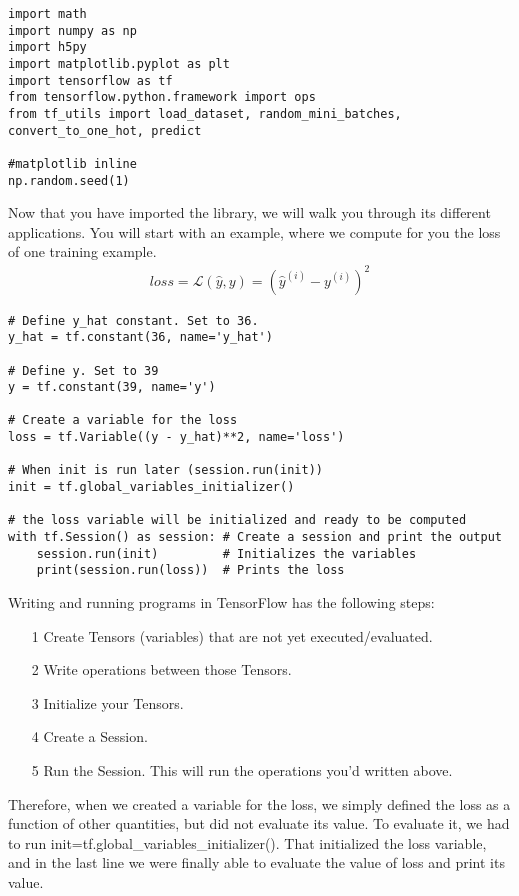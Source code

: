 \begin{verbatim}
import math
import numpy as np
import h5py
import matplotlib.pyplot as plt
import tensorflow as tf
from tensorflow.python.framework import ops
from tf_utils import load_dataset, random_mini_batches, convert_to_one_hot, predict

#matplotlib inline
np.random.seed(1)
\end{verbatim}

Now that you have imported the library, we will walk you through its different applications. You will start with an example, where we compute for you the loss of one training example. 
\begin{align}
loss = \mathcal{L}(\hat{y}, y) = (\hat y^{(i)} - y^{(i)})^2
\end{align}


\begin{verbatim}
# Define y_hat constant. Set to 36.
y_hat = tf.constant(36, name='y_hat')  

# Define y. Set to 39          
y = tf.constant(39, name='y') 
                   
# Create a variable for the loss
loss = tf.Variable((y - y_hat)**2, name='loss')  

# When init is run later (session.run(init))
init = tf.global_variables_initializer()         

# the loss variable will be initialized and ready to be computed
with tf.Session() as session: # Create a session and print the output
    session.run(init)         # Initializes the variables
    print(session.run(loss))  # Prints the loss
\end{verbatim}

Writing and running programs in TensorFlow has the following steps:
\begin{itemize}
\item[1] Create Tensors (variables) that are not yet executed/evaluated.
\item[2] Write operations between those Tensors.
\item[3] Initialize your Tensors.
\item[4] Create a Session.
\item[5] Run the Session. This will run the operations you'd written above.
\end{itemize}

Therefore, when we created a variable for the loss, we simply defined the loss as a function of other quantities, but did not evaluate its value. To evaluate it, we had to run init=tf.global\_variables\_initializer(). That initialized the loss variable, and in the last line we were finally able to evaluate the value of loss and print its value.


